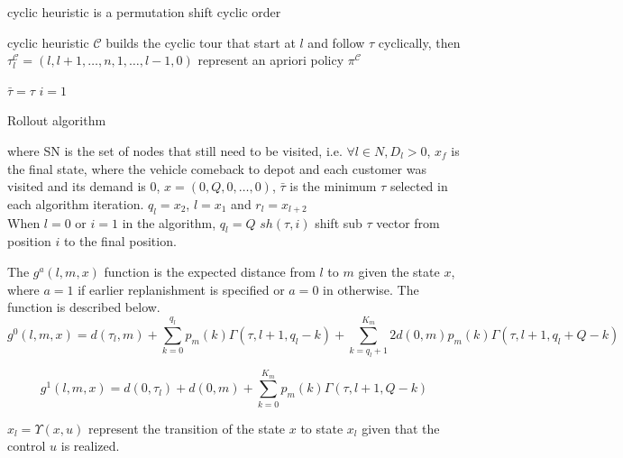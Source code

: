 cyclic heuristic is a permutation shift cyclic order

cyclic heuristic $\mathcal{C}$ builds the cyclic tour that start at $l$ and follow $\tau$ cyclically, then $\tau^\mathcal{C}_l = (l, l+1, \ldots , n , 1 , \ldots , l-1, 0)$ represent an apriori policy $\pi^\mathcal{C}$




\begin{algorithm}
$\bar\tau = \tau$\;
$i=1$\;
\caption{Rollout algorithm}\label{algo:rollout1step}
\end{algorithm}

where SN is the set of nodes that still need to be visited, i.e. $\forall l \in N, D_l > 0$, 
$x_f$ is the final state, where the vehicle comeback to depot and each customer was visited and its demand is $0$, $x=(0,Q,0,\ldots,0)$, $\bar\tau$ is the minimum $\tau$ selected in each algorithm iteration.
$q_l = x_2$, $l=x_1$ and $r_l=x_{l+2}$\\
When $l=0$ or $i=1$ in the algorithm, $q_l = Q$
$sh(\tau,i)$ shift sub $\tau$ vector from position $i$ to the final position. 

The $g^a(l,m,x)$ function is the expected distance from $l$ to $m$ given the state $x$, where $a=1$ if earlier replanishment is specified or $a=0$ in otherwise. The function is described below.
\begin{equation}\label{ra:Cost2Go0}
 g^0(l,m,x)=d(\tau_l,m)+\sum_{k=0}^{q_l}p_m(k)\Gamma(\tau,l+1,q_l-k)+\sum_{k=q_l+1}^{K_m}2d(0,m)p_m(k)\Gamma(\tau,l+1,q_l+Q-k)%
\end{equation}

\begin{equation}\label{ra:Cost2Go1}
 g^1(l,m,x)=d(0,\tau_l)+d(0,m)+\sum_{k=0}^{K_m}p_m(k)\Gamma(\tau,l+1,Q-k)
\end{equation}


$x_l = \Upsilon(x,u)$ represent the transition of the state $x$ to state $x_l$ given that the control $u$ is realized.





